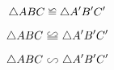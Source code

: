 \documentclass{ctexart}
\newcommand\backcong{\mathrel{\reflectbox{$\cong$}}}
\newcommand*\zhcong{%
        \mathrel{\text{%
                        \tikz \draw[baseline] (-.2em,1.35ex) .. controls (-.46em,1.6ex) and (-.54em,.65ex) .. (-.25em,.65ex) .. controls (-.06em,.65ex) and (.06em,1.35ex) .. (.25em,1.35ex) .. controls (.54em,1.35ex) and (.46em,.4ex) .. (.2em,.65ex) (-.46em,.4ex) -- (.46em,.4ex) (-.46em,0ex) -- (.46em,0ex);%
}}}
\newcommand*\zhsim{%
        \mathrel{\text{%
                        \tikz \draw[baseline] (-.25em,1.15ex) .. controls (-.55em,1.15ex) and (-.51em,.23ex) .. (-.275em,.23ex) .. controls (0,.23ex) and (0,1.15ex) .. (.275em,1.15ex) .. controls (.51em,1.15ex) and (.55em,.23ex) .. (.25em,.23ex);%
}}}
\begin{document}
        
\[
\triangle {ABC}\backcong{\triangle {A'B'C'}}
\]
        
\[
\triangle {ABC}\zhcong{\triangle {A'B'C'}}
\]

\[
\triangle {ABC}\zhsim{\triangle {A'B'C'}}
\]
\end{document}
